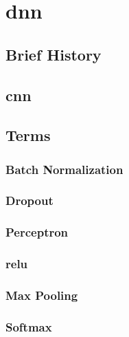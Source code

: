 \section{\acrlong{dnn}} \label{sec:bt/DNN}
\subsection{Brief History}
\subsection{\acrlong{cnn}}

\subsection{Terms}
\subsubsection{Batch Normalization}
\subsubsection{Dropout}
\subsubsection{Perceptron}
\subsubsection{\acrlong{relu}}
\subsubsection{Max Pooling}
\subsubsection{Softmax}